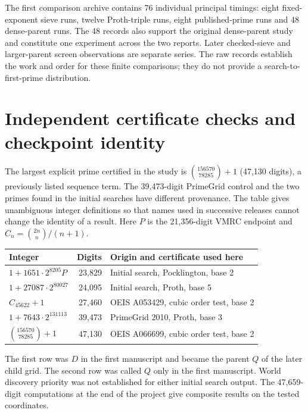 \documentclass[11pt,a4paper,oneside,openany]{report}
\begin{document}
The first comparison archive contains 76 individual principal timings: eight fixed-exponent sieve runs, twelve Proth-triple runs, eight published-prime runs and 48 dense-parent runs. The 48 records also support the original dense-parent study and constitute one experiment across the two reports. Later checked-sieve and larger-parent screen observations are separate series. The raw records establish the work and order for these finite comparisons; they do not provide a search-to-first-prime distribution.

\appendix

\chapter{Independent certificate checks and checkpoint identity}
\label{app:fingerprints}
The largest explicit prime certified in the study is
$\binom{156570}{78285}+1$ (47,130 digits), a previously listed sequence
term. The 39,473-digit PrimeGrid control and the two primes found in the
initial searches have different provenance. The table gives unambiguous
integer definitions so that names used in successive releases cannot change
the identity of a result. Here $P$ is the 21,356-digit VMRC endpoint and
$C_n=\binom{2n}{n}/(n+1)$.

\begin{center}\small
\begin{tabular}{@{}lrl@{}}\toprule
Integer & Digits & Origin and certificate used here\\\midrule
$1+1651\cdot2^{8205}P$ &23,829& Initial search, Pocklington, base 2\\
$1+27087\cdot2^{80027}$ &24,095& Initial search, Proth, base 5\\
$C_{45622}+1$ &27,460& OEIS A053429, cubic order test, base 2\\
$1+7643\cdot2^{131113}$ &39,473& PrimeGrid 2010, Proth, base 3\\
$\binom{156570}{78285}+1$ &47,130& OEIS A066699, cubic order test, base 2\\
\bottomrule\end{tabular}
\end{center}

The first row was $D$ in the first manuscript and became the parent $Q$
of the later child grid. The second row was called $Q$ only in the first
manuscript. World discovery priority was not established for either initial
search output. The 47,659-digit computations at the end of the project
give composite results on the tested coordinates.
\end{document}
